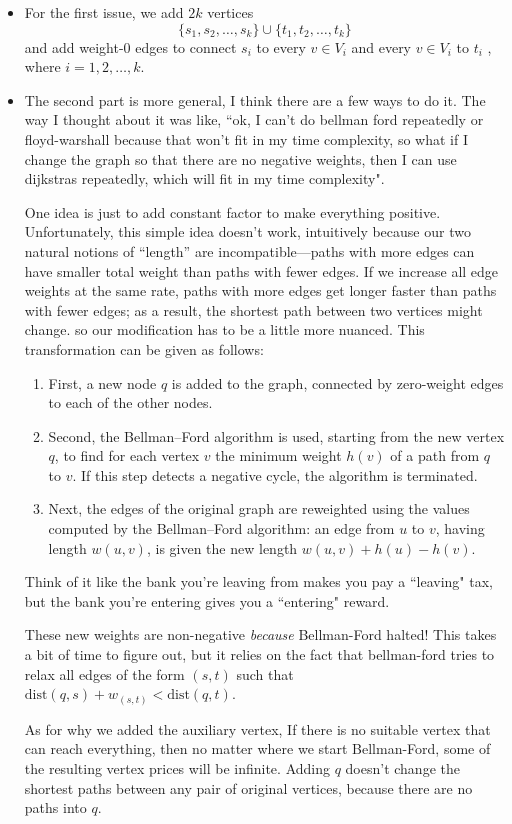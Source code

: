 \documentclass{article}
\begin{document}
\begin{itemize}
    \item For the first issue, we add \(2k\) vertices 
    \[ \{s_1, s_2, \dots , s_k\} \cup \{t_1, t_2, \dots , t_k\} \]
    and add weight-0 edges to connect \(s_i\) to every \(v \in V_{i}\) and every \(v \in V_{i}\) to \(t_i\)
    , where \(i = 1, 2, \dots , k\).
    \item The second part is more general, I think there are a few ways to do it. The way I thought about it was like, ``ok, I can't do bellman ford repeatedly or floyd-warshall because that won't fit in my time complexity, so what if I change the graph so that there are no negative weights, then I can use dijkstras repeatedly, which will fit in my time complexity". 
    
    \vspace{2mm}
    One idea is just to add constant factor to make everything positive. Unfortunately, this simple idea doesn’t work, intuitively because our two natural notions of “length” are incompatible—paths with more edges can have smaller total weight than paths with fewer edges. If we increase all edge weights at the same rate, paths with more edges get longer faster than paths with fewer edges; as a result, the shortest path between two vertices might change. so our modification has to be a little more nuanced. This transformation can be given as follows:
    \begin{enumerate}[label = \roman*.]
        \item First, a new node $q$ is added to the graph, connected by zero-weight edges to each of the other nodes.
        \item  Second, the Bellman–Ford algorithm is used, starting from the new vertex $q$, to find for each vertex $v$ the minimum weight $h(v)$ of a path from $q$ to $v$. If this step detects a negative cycle, the algorithm is terminated.
        \item Next, the edges of the original graph are reweighted using the values computed by the Bellman–Ford algorithm: an edge from $u$ to $v$, having length $w(u,v)$, is given the new length $w(u,v) + h(u) - h(v)$.
    \end{enumerate}
    Think of it like the bank you're leaving from makes you pay a ``leaving" tax, but the bank you're entering gives you a ``entering" reward.

    \vspace{2mm}
    These new weights are non-negative \textit{because} Bellman-Ford halted! This takes a bit of time to figure out, but it relies on the fact that bellman-ford tries to relax all edges of the form $(s, t)$ such that $\text{dist}(q, s) + w_{(s, t)} < \text{dist}(q, t)$.

    \vspace{2mm}
    As for why we added the auxiliary vertex, If there is no suitable vertex that can reach everything, then no matter where we start Bellman-Ford, some of the resulting vertex prices will be infinite. Adding $q$ doesn't change the shortest paths between any pair of original vertices, because there are no paths into $q$.
\end{itemize}
\end{document}
